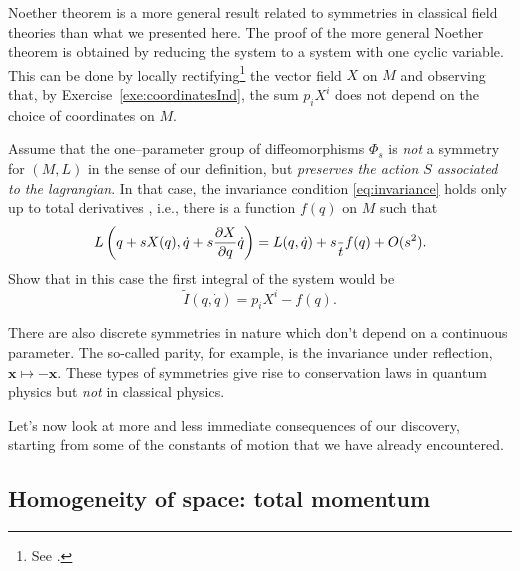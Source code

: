 \documentclass[english,fontsize=11pt,paper=a5,oneside]{scrbook}
\newcommand{\bx}{\bm{x}}
\let\d\relax
\newcommand{\d}{\mathrm{d}}
\theoremstyle{definition}
\newenvironment{remark}
  {\pushQED{\qed}\renewcommand{\qedsymbol}{$\lozenge$}\remarkx}
  {\popQED\endremarkx}
\newenvironment{exercise}
  {\pushQED{\qed}\renewcommand{\qedsymbol}{$\maltese$}\exercisex}
  {\popQED\endexercisex}
\begin{document}
\begin{remark}
  Noether theorem is a more general result related to symmetries in classical field theories than what we presented here.
  The proof of the more general Noether theorem is obtained by reducing the system to a system with one cyclic variable.
  This can be done by locally rectifying\footnote{See \cite[Chapter 3.5]{lectures:aom:seri}.} the vector field $X$ on $M$ and
  observing that, by Exercise~\ref{exe:coordinatesInd}, the sum $p_i X^i$ does not depend on the choice of coordinates on $M$.
\end{remark}

\begin{exercise}
  Assume that the one--parameter group of diffeomorphisms $\Phi_s$ is \emph{not} a symmetry for $(M,L)$ in the sense of our definition, but \emph{preserves the action $S$ associated to the lagrangian}.
  In that case, the invariance condition \eqref{eq:invariance} holds only up to total derivatives \cite[Chapter 4.20]{book:gelfand}, i.e., there is a function $f(q)$ on $M$ such that
  \begin{equation}
    L\left( q + s X(q), \dot q + s \frac{\partial X}{\partial q} \dot q\right)
    = L(q, \dot q) + s \frac{\d}{\d t}f(q) + O(s^2).
  \end{equation}
  Show that in this case the first integral of the system would be
  \begin{equation}
    \widetilde I(q, \dot q) = p_i X^i - f(q).
  \end{equation}
\end{exercise}

\begin{remark}
  There are also discrete symmetries in nature which don't depend on a continuous parameter. The so-called parity, for example, is the invariance under reflection, $\bx \mapsto -\bx$.
  These types of symmetries give rise to conservation laws in quantum physics but \emph{not} in classical physics.
\end{remark}

Let's now look at more and less immediate consequences of our discovery, starting from some of the constants of motion that we have already encountered.

\subsection{Homogeneity of space: total momentum}
\end{document}
